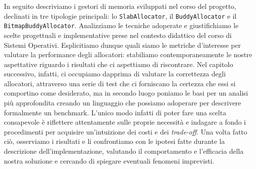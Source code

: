 In seguito descriviamo i gestori di memoria sviluppati nel corso del progetto, declinati in tre tipologie principali: lo \texttt{SlabAllocator}, il \texttt{BuddyAllocator} e il \texttt{BitmapBuddyAllocator}. Analizziamo le tecniche adoperate e giustifichiamo le scelte progettuali e implementative prese nel contesto didattico del corso di Sistemi Operativi. Esplicitiamo dunque quali siamo le metriche d'interesse per valutare la performance degli allocatori: stabiliamo contemporaneamente le nostre aspettative riguardo i risultati che ci aspettiamo di riscontrare.
Nel capitolo successivo, infatti, ci occupiamo dapprima di valutare la correttezza degli allocatori, attraverso una serie di test che ci forniscano la certezza che essi si comportino come desiderato, ma in secondo luogo poniamo le basi per un analisi più approfondita creando un linguaggio che possiamo adoperare per descrivere formalmente un benchmark. 
L'unico modo infatti di poter fare una scelta consapevole è riflettere attentamente sulle proprie necessità e indagare a fondo i procedimenti per acquisire un'intuizione dei costi e dei \textit{trade-off}.
Una volta fatto ciò, osserviamo i risultati e li confrontiamo con le ipotesi fatte durante la descrizione dell'implementazione, valutando il comportamento e l'efficacia della nostra soluzione e cercando di spiegare eventuali fenomeni imprevisti. 